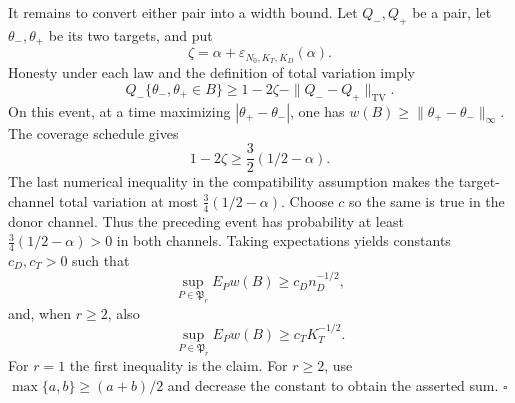 It remains to convert either pair into a width bound.  Let \(Q_-,Q_+\) be a pair, let \(\theta_-,\theta_+\) be its two targets, and put
\[
 \zeta=\alpha+\varepsilon_{N_0,K_T,K_D}(\alpha).
\]
Honesty under each law and the definition of total variation imply
\[
 Q_-\{\theta_-,\theta_+\in B\}
 \ge1-2\zeta-\|Q_--Q_+\|_{\mathrm{TV}}.
\]
On this event, at a time maximizing \(|\theta_+-\theta_-|\), one has \(w(B)\ge\|\theta_+-\theta_-\|_\infty\).  The coverage schedule gives
\[
 1-2\zeta\ge\frac32(1/2-\alpha).
\]
The last numerical inequality in the compatibility assumption makes the target-channel total variation at most \(\frac34(1/2-\alpha)\).  Choose \(c\) so the same is true in the donor channel.  Thus the preceding event has probability at least \(\frac34(1/2-\alpha)>0\) in both channels.  Taking expectations yields constants \(c_D,c_T>0\) such that
\[
 \sup_{P\in\mathfrak P_r}E_Pw(B)\ge c_Dn_D^{-1/2},
\]
and, when \(r\ge2\), also
\[
 \sup_{P\in\mathfrak P_r}E_Pw(B)\ge c_TK_T^{-1/2}.
\]
For \(r=1\) the first inequality is the claim.  For \(r\ge2\), use \(\max\{a,b\}\ge(a+b)/2\) and decrease the constant to obtain the asserted sum. \(\square\)